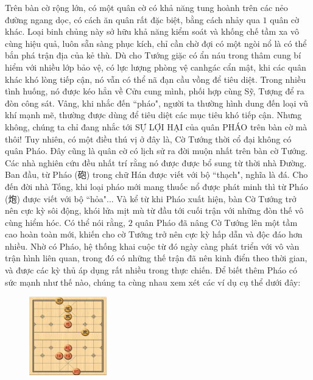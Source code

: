 \vspace*{150pt}
\begin{multicols}{2}
	Trên bàn cờ rộng lớn, có một quân cờ có khả năng tung hoành trên các nẻo đường ngang dọc, có cách ăn quân rất đặc biệt, bằng cách nhảy qua $1$ quân cờ khác. Loại binh chủng này sở hữu khả năng kiểm soát và khống chế tầm xa vô cùng hiệu quả, luôn sẵn sàng phục kích, chỉ cần chờ đợi có một ngòi nổ là có thể bắn phá trận địa của kẻ thù. Dù cho Tướng giặc có ẩn náu trong thâm cung bí hiểm với nhiều lớp bảo vệ, có lực lượng phòng vệ canh\linebreak gác cẩn mật, khi các quân khác khó lòng tiếp cận, nó vẫn có thể nã đạn cầu vồng để tiêu diệt. Trong nhiều tình huống, nó được kéo hẳn về Cửu cung mình, phối hợp cùng Sỹ, Tượng để ra đòn công sát.  Vâng, khi nhắc đến ``pháo", người ta thường hình dung đến loại vũ khí mạnh mẽ, thường được dùng để tiêu diệt các mục tiêu khó tiếp cận. Nhưng không, chúng ta chỉ đang nhắc tới SỰ LỢI HẠI của quân PHÁO trên bàn cờ mà thôi!  
	\vskip 0.05cm
	Tuy nhiên, có một điều thú vị ở đây là, Cờ Tướng thời cổ đại không có quân Pháo. Đây cũng là quân cờ có lịch sử ra đời muộn nhất trên bàn cờ Tướng. Các nhà nghiên cứu đều nhất trí rằng nó được được bổ sung từ thời nhà Đường. Ban đầu, từ Pháo (砲) trong chữ Hán được viết với bộ ``thạch", nghĩa là đá. Cho đến đời nhà Tống, khi loại pháo mới mang thuốc nổ được phát minh thì từ Pháo (炮) được viết với bộ ``hỏa"... Và kể từ khi Pháo xuất hiện, bàn Cờ Tướng trở nên cực kỳ sôi động, khói lửa mịt mù từ đầu tới cuối trận với những đòn thế vô cùng hiểm hóc. Có thể nói rằng, $2$ quân Pháo đã nâng Cờ Tướng lên một tầm cao hoàn toàn mới, khiến cho cờ Tướng trở nên cực kỳ hấp dẫn và độc đáo hơn nhiều. Nhờ có Pháo, hệ thống khai cuộc từ đó ngày càng phát triển với vô vàn trận hình liên quan, trong đó có những thế trận đã nên kinh điển theo thời gian, và được các kỳ thủ áp dụng rất nhiều trong \linebreak thực chiến. 
	\vskip 0.05cm
	Để biết thêm Pháo có sức mạnh như thế nào, chúng ta cùng nhau xem xét các ví dụ cụ thể dưới đây:
	\begin{figure}[H]
		\vspace*{-5pt}
		\centering
		\captionsetup{labelformat= empty, justification=centering}
		\includegraphics[width= 0.3\textwidth]{2}

\end{figure}
\end{multicols}
